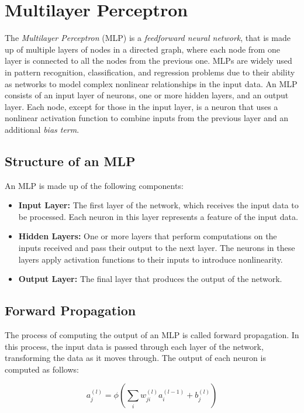 \section{Multilayer Perceptron}
The \emph{Multilayer Perceptron} (MLP) \cite{multilayer_perceptron} is a \emph{feedforward neural network}, that is made up of multiple layers of nodes in a directed graph, where each node from one layer is connected to all the nodes from the previous one.
MLPs are widely used in pattern recognition, classification, and regression problems due to their ability as networks to model complex nonlinear relationships in the input data.
An MLP consists of an input layer of neurons, one or more hidden layers, and an output layer.
Each node, except for those in the input layer, is a neuron that uses a nonlinear activation function to combine inputs from the previous layer and an additional \emph{bias term}.

\subsection{Structure of an MLP}

An MLP is made up of the following components:
\begin{itemize}
	\item \textbf{Input Layer:} The first layer of the network, which receives the input data to be processed. Each neuron in this layer represents a feature of the input data.
	\item \textbf{Hidden Layers:} One or more layers that perform computations on the inputs received and pass their output to the next layer. The neurons in these layers apply activation functions to their inputs to introduce nonlinearity.
	\item \textbf{Output Layer:} The final layer that produces the output of the network.
\end{itemize}

\subsection{Forward Propagation}

The process of computing the output of an MLP is called forward propagation.
In this process, the input data is passed through each layer of the network, transforming the data as it moves through. The output of each neuron is computed as follows:

\begin{equation}
	a^{(l)}_j = \phi\left(\sum_{i} w^{(l)}_{ji} a^{(l-1)}_i + b^{(l)}_j\right)
\end{equation}


